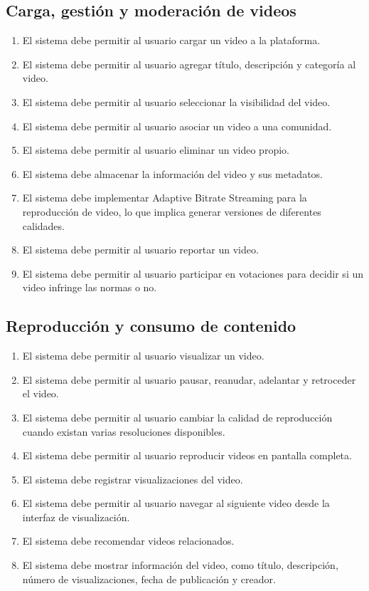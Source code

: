 \subsection{Carga, gestión y moderación de videos}



\begin{enumerate}[label=\textbf{RF-CGMV \arabic*.}, leftmargin=*]
    \item El sistema debe permitir al usuario cargar un video a la plataforma.
    \item El sistema debe permitir al usuario agregar título, descripción y categoría al video.
    \item El sistema debe permitir al usuario seleccionar la visibilidad del video.
    \item El sistema debe permitir al usuario asociar un video a una comunidad.
    \item El sistema debe permitir al usuario eliminar un video propio.
    \item El sistema debe almacenar la información del video y sus metadatos.
    \item El sistema debe implementar Adaptive Bitrate Streaming para la reproducción de video, lo que implica generar versiones de diferentes calidades.
    \item El sistema debe permitir al usuario reportar un video.
    \item El sistema debe permitir al usuario participar en votaciones para decidir si un video infringe las normas o no.
\end{enumerate}

\subsection{Reproducción y consumo de contenido}



\begin{enumerate}[label=\textbf{RF-RCC \arabic*.}, leftmargin=*]
    \item El sistema debe permitir al usuario visualizar un video.
    \item El sistema debe permitir al usuario pausar, reanudar, adelantar y retroceder el video.
    \item El sistema debe permitir al usuario cambiar la calidad de reproducción cuando existan varias resoluciones disponibles.
    \item El sistema debe permitir al usuario reproducir videos en pantalla completa.
    \item El sistema debe registrar visualizaciones del video.
    \item El sistema debe permitir al usuario navegar al siguiente video desde la interfaz de visualización.
    \item El sistema debe recomendar videos relacionados.
    \item El sistema debe mostrar información del video, como título, descripción, número de visualizaciones, fecha de publicación y creador.
\end{enumerate}

